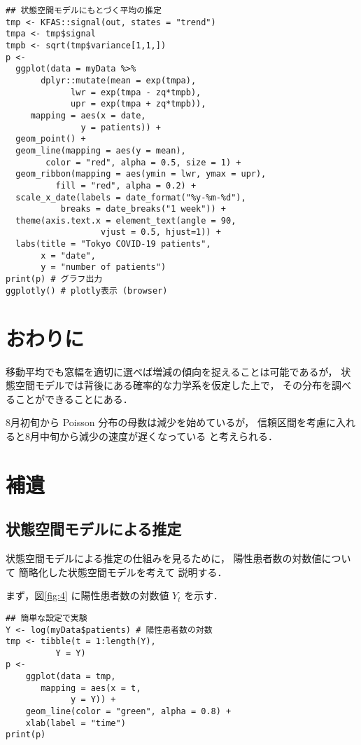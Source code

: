 \documentclass[10pt,oneside,fleqn]{scrartcl}
\begin{document}
\begin{verbatim}
## 状態空間モデルにもとづく平均の推定
tmp <- KFAS::signal(out, states = "trend")
tmpa <- tmp$signal
tmpb <- sqrt(tmp$variance[1,1,])
p <-
  ggplot(data = myData %>%
	   dplyr::mutate(mean = exp(tmpa),
			 lwr = exp(tmpa - zq*tmpb),
			 upr = exp(tmpa + zq*tmpb)),
	 mapping = aes(x = date,
		       y = patients)) +
  geom_point() +
  geom_line(mapping = aes(y = mean),
	    color = "red", alpha = 0.5, size = 1) +
  geom_ribbon(mapping = aes(ymin = lwr, ymax = upr),
	      fill = "red", alpha = 0.2) +
  scale_x_date(labels = date_format("%y-%m-%d"), 
	       breaks = date_breaks("1 week")) + 
  theme(axis.text.x = element_text(angle = 90, 
				   vjust = 0.5, hjust=1)) +
  labs(title = "Tokyo COVID-19 patients",
       x = "date",
       y = "number of patients")
print(p) # グラフ出力
ggplotly() # plotly表示 (browser)
\end{verbatim}

\section{おわりに}
\label{sec:orgca1e731}

移動平均でも窓幅を適切に選べば増減の傾向を捉えることは可能であるが，
状態空間モデルでは背後にある確率的な力学系を仮定した上で，
その分布を調べることができることにある．

8月初旬から Poisson 分布の母数は減少を始めているが，
信頼区間を考慮に入れると8月中旬から減少の速度が遅くなっている
と考えられる．

\section{補遺}
\label{sec:org39fb185}
\subsection{状態空間モデルによる推定}
\label{sec:orga5768c4}

状態空間モデルによる推定の仕組みを見るために，
陽性患者数の対数値について
簡略化した状態空間モデルを考えて
説明する．

まず，図\ref{fig:4} に陽性患者数の対数値 \(Y_{t}\) を示す．
\begin{figure}[htbp]
  \centering
  \myGraph*{}
\end{figure}

\begin{verbatim}
## 簡単な設定で実験
Y <- log(myData$patients) # 陽性患者数の対数
tmp <- tibble(t = 1:length(Y),
	      Y = Y)
p <- 
    ggplot(data = tmp, 
	   mapping = aes(x = t,
			 y = Y)) +
    geom_line(color = "green", alpha = 0.8) +
    xlab(label = "time")
print(p)
\end{verbatim}
\end{document}
